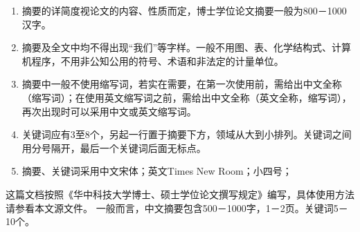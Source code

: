 {\begin{enumerate}
\begin{enumerate}
    \end{enumerate}
    \item 摘要的详简度视论文的内容、性质而定，博士学位论文摘要一般为800－1000汉字。
    \item 摘要及全文中均不得出现“我们”等字样。一般不用图、表、化学结构式、计算机程序，不用非公知公用的符号、术语和非法定的计量单位。
    \item 摘要中一般不使用缩写词，若实在需要，在第一次使用前，需给出中文全称（缩写词）；在使用英文缩写词之前，需给出中文全称（英文全称，缩写词），再次出现时可以采用中文或英文缩写词。
    \item 关键词应有3至8个，另起一行置于摘要下方，领域从大到小排列。关键词之间用分号隔开，最后一个关键词后面无标点。
    \item 摘要、关键词采用中文宋体；英文Times New Room；小四号；
\end{enumerate}

这篇文档按照《华中科技大学博士、硕士学位论文撰写规定》编写，具体使用方法请参看本文源文件。
一般而言，中文摘要包含500－1000字，1－2页。关键词5－10个。}



